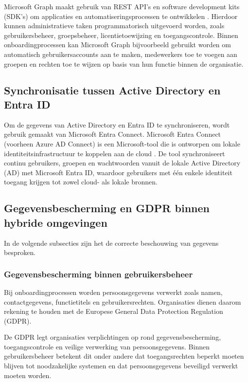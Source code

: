Microsoft Graph maakt gebruik van REST API’s en software development kits (SDK’s) om applicaties en automatiseringsprocessen te ontwikkelen \autocite{Microsoft2026b}. Hierdoor kunnen administratieve taken programmatorisch uitgevoerd worden, zoals gebruikersbeheer, groepsbeheer, licentietoewijzing en toegangscontrole. Binnen onboardingprocessen kan Microsoft Graph bijvoorbeeld gebruikt worden om automatisch gebruikersaccounts aan te maken, medewerkers toe te voegen aan groepen en rechten toe te wijzen op basis van hun functie binnen de organisatie.

\subsection{Synchronisatie tussen Active Directory en Entra ID}

Om de gegevens van Active Directory en Entra ID te synchroniseren, wordt gebruik gemaakt van Microsoft Entra Connect. Microsoft Entra Connect (voorheen Azure AD Connect) is een Microsoft-tool die is ontworpen om lokale identiteitsinfrastructuur te koppelen aan de cloud \autocite{Solheim2024}. De tool synchroniseert continu gebruikers, groepen en wachtwoorden vanuit de lokale Active Directory (AD) met Microsoft Entra ID, waardoor gebruikers met één enkele identiteit toegang krijgen tot zowel cloud- als lokale bronnen. 

\subsection{Gegevensbescherming en GDPR binnen hybride omgevingen}

In de volgende subsecties zijn het de correcte beschouwing van gegevens besproken. 

\subsubsection{Gegevensbescherming binnen gebruikersbeheer}

Bij onboardingprocessen worden persoonsgegevens verwerkt zoals namen, contactgegevens, functietitels en gebruikersrechten. Organisaties dienen daarom rekening te houden met de Europese General Data Protection Regulation (GDPR).

De GDPR legt organisaties verplichtingen op rond gegevensbescherming, toegangscontrole en veilige verwerking van persoonsgegevens. Binnen gebruikersbeheer betekent dit onder andere dat toegangsrechten beperkt moeten blijven tot noodzakelijke systemen en dat persoonsgegevens beveiligd verwerkt moeten worden.


